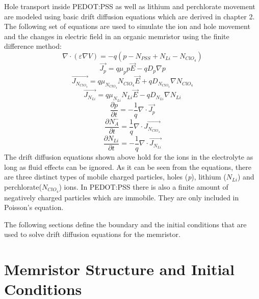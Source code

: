 \begin{doublespace}
Hole transport inside PEDOT:PSS as well as lithium and perchlorate movement are modeled using basic drift diffusion equations which are derived in chapter 2. The following set of equations are used to simulate the ion and hole movement and the changes in electric field in an organic memristor using the finite difference method:
\begin{equation}
\nabla \cdot  (\varepsilon \nabla V)=-q( p-N_{PSS}+ N_{Li} - N_{ClO_{4}})
\end{equation}
\begin{equation}
\vec{J_p}=q\mu_p p \vec{E}-q D_p \nabla p
\end{equation}
\begin{equation}
\vec{J_{N_{ClO_{4}}}}=q\mu_{N_{ClO_{4}}} N_{ClO_{4}} \vec{E}+q D_{N_{ClO_{4}}} \nabla N_{ClO_{4}}
\end{equation}
\begin{equation}
\vec{J_{N_{Li}}}=q\mu_{N_{Li}} N_{Li} \vec{E}-q D_{N_{Li}} \nabla N_{Li}
\end{equation}
\begin{equation}
\frac{\partial p}{\partial t}=-\frac{1}{q}\nabla \cdot \vec{J_p}
\end{equation}
\begin{equation}
\frac{\partial N_{A}^{-}}{\partial t}=\frac{1}{q}\nabla \cdot \vec{J_{N_{ClO_{4}}}}
\end{equation}
\begin{equation}
\frac{\partial N_{Li}}{\partial t}=-\frac{1}{q}\nabla \cdot \vec{J_{N_{Li}}}
\end{equation}
The drift diffusion equations shown above hold for the ions in the electrolyte as long as fluid effects can be ignored. As it can be seen from the equations, there are three distinct types of mobile charged particles, holes (\textit{p}), lithium ($N_{Li}$) and perchlorate($N_{ClO_{4}}$) ions. In PEDOT:PSS there is also a finite amount of negatively charged particles which are immobile. They are only included in Poisson's equation.

The following sections define the boundary and the initial conditions that are used to solve drift diffusion equations for the memristor.

\section{Memristor Structure and Initial Conditions}


\end{doublespace}
